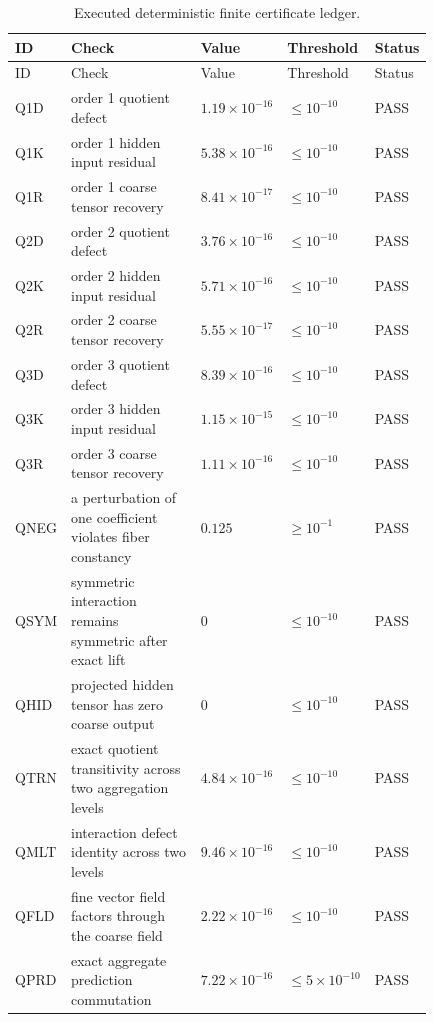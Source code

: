 \begin{longtable}{@{}p{0.08\linewidth}p{0.43\linewidth}p{0.12\linewidth}p{0.12\linewidth}p{0.08\linewidth}@{}}
\caption{Executed deterministic finite certificate ledger.}\label{tab:executed-ledger}\\
\toprule
ID & Check & Value & Threshold & Status\\
\midrule
\endfirsthead
\toprule
ID & Check & Value & Threshold & Status\\
\midrule
\endhead
Q1D & order 1 quotient defect & $1.19\times 10^{-16}$ & $\leq 10^{-10}$ & PASS\\
Q1K & order 1 hidden input residual & $5.38\times 10^{-16}$ & $\leq 10^{-10}$ & PASS\\
Q1R & order 1 coarse tensor recovery & $8.41\times 10^{-17}$ & $\leq 10^{-10}$ & PASS\\
Q2D & order 2 quotient defect & $3.76\times 10^{-16}$ & $\leq 10^{-10}$ & PASS\\
Q2K & order 2 hidden input residual & $5.71\times 10^{-16}$ & $\leq 10^{-10}$ & PASS\\
Q2R & order 2 coarse tensor recovery & $5.55\times 10^{-17}$ & $\leq 10^{-10}$ & PASS\\
Q3D & order 3 quotient defect & $8.39\times 10^{-16}$ & $\leq 10^{-10}$ & PASS\\
Q3K & order 3 hidden input residual & $1.15\times 10^{-15}$ & $\leq 10^{-10}$ & PASS\\
Q3R & order 3 coarse tensor recovery & $1.11\times 10^{-16}$ & $\leq 10^{-10}$ & PASS\\
QNEG & a perturbation of one coefficient violates fiber constancy & $0.125$ & $\geq 10^{-1}$ & PASS\\
QSYM & symmetric interaction remains symmetric after exact lift & $0$ & $\leq 10^{-10}$ & PASS\\
QHID & projected hidden tensor has zero coarse output & $0$ & $\leq 10^{-10}$ & PASS\\
QTRN & exact quotient transitivity across two aggregation levels & $4.84\times 10^{-16}$ & $\leq 10^{-10}$ & PASS\\
QMLT & interaction defect identity across two levels & $9.46\times 10^{-16}$ & $\leq 10^{-10}$ & PASS\\
QFLD & fine vector field factors through the coarse field & $2.22\times 10^{-16}$ & $\leq 10^{-10}$ & PASS\\
QPRD & exact aggregate prediction commutation & $7.22\times 10^{-16}$ & $\leq 5\times 10^{-10}$ & PASS\\

\end{longtable}
